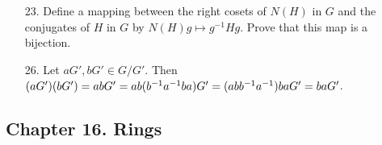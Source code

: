 {\begin{itemize}
 
\item[23.]
Define a mapping between the right cosets of $N(H)$ in $G$ and the
conjugates of $H$ in $G$ by $N(H) g \mapsto g^{-1} H g$. Prove that
this map is a bijection.
 
 
\item[26.]
Let $a G', b G' \in G/G'$. Then $(a G')( b G') = ab G' =
ab(b^{-1}a^{-1}ba) G' = \\ (abb^{-1}a^{-1})ba G' =  ba G'$.
 
 
 
\end{itemize}
}
 
\subsection*{Chapter 16. Rings}
 
